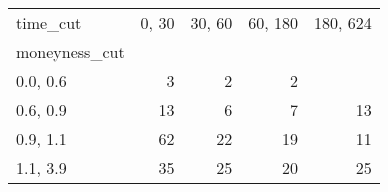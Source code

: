 \begin{tabular}{lrrrr}
\toprule
time\_cut &  0, 30 &  30, 60 &  60, 180 &  180, 624 \\
moneyness\_cut &          &           &            &             \\
\midrule
0.0, 0.6    &        3 &         2 &          2 &             \\
0.6, 0.9    &       13 &         6 &          7 &          13 \\
0.9, 1.1    &       62 &        22 &         19 &          11 \\
1.1, 3.9    &       35 &        25 &         20 &          25 \\
\bottomrule
\end{tabular}
